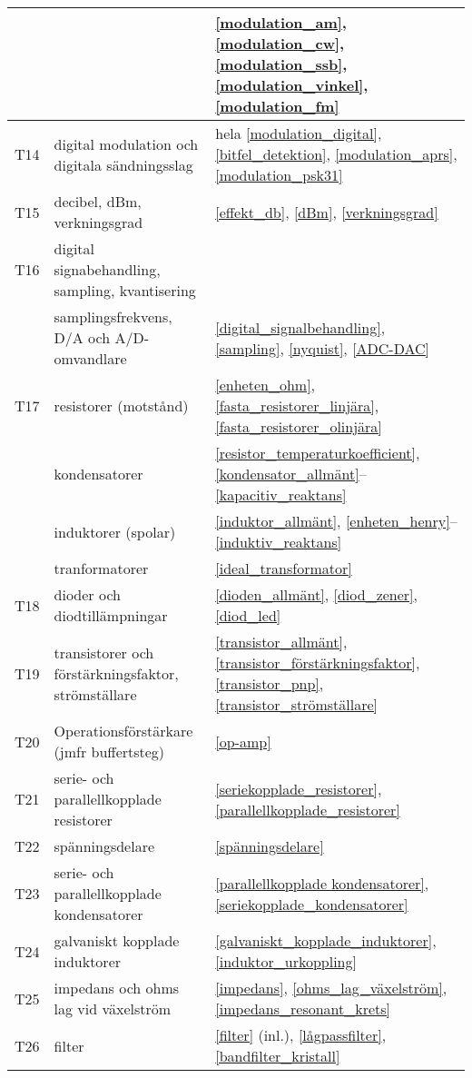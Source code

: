\begin{table}[H]
\begin{tabular}{rll}
 && \ref{modulation_am}, \ref{modulation_cw}, \ref{modulation_ssb}, 
 \ref{modulation_vinkel}, \ref{modulation_fm}\\ \hline
T14 & digital modulation och digitala sändningsslag &
hela \ref{modulation_digital}, \ref{bitfel_detektion}, \ref{modulation_aprs}, 
\ref{modulation_psk31}\\ \hline
T15 & decibel, dBm, verkningsgrad &
\ref{effekt_db}, \ref{dBm}, \ref{verkningsgrad}\\ \hline
T16 & digital signabehandling, sampling, kvantisering & \\
   & samplingsfrekvens, D/A och A/D-omvandlare &
\ref{digital_signalbehandling}, \ref{sampling}, \ref{nyquist}, \ref{ADC-DAC}\\ \hline
T17 & resistorer (motstånd) & 
\ref{enheten_ohm}, \ref{fasta_resistorer_linjära}, \ref{fasta_resistorer_olinjära}\\
& kondensatorer & 
\ref{resistor_temperaturkoefficient}, \ref{kondensator_allmänt}--\ref{kapacitiv_reaktans}\\ 
& induktorer (spolar) &
\ref{induktor_allmänt}, \ref{enheten_henry}--\ref{induktiv_reaktans} \\
& tranformatorer & 
\ref{ideal_transformator} \\ \hline
T18 & dioder och diodtillämpningar &
\ref{dioden_allmänt}, \ref{diod_zener}, \ref{diod_led}\\ \hline
T19 & transistorer och förstärkningsfaktor, strömställare &
\ref{transistor_allmänt}, \ref{transistor_förstärkningsfaktor}, \ref{transistor_pnp}, 
\ref{transistor_strömställare} \\ \hline
T20 & Operationsförstärkare (jmfr buffertsteg) & 
\ref{op-amp} \\ \hline
T21 & serie- och parallellkopplade resistorer &
\ref{seriekopplade_resistorer}, \ref{parallellkopplade_resistorer}\\ \hline
T22 & spänningsdelare & 
\ref{spänningsdelare}\\ \hline
T23 & serie- och parallellkopplade kondensatorer & 
\ref{parallellkopplade kondensatorer}, \ref{seriekopplade_kondensatorer} \\ \hline
T24 & galvaniskt kopplade induktorer & 
\ref{galvaniskt_kopplade_induktorer}, \ref{induktor_urkoppling}\\ \hline
T25 & impedans och ohms lag vid växelström & 
\ref{impedans}, \ref{ohms_lag_växelström}, \ref{impedans_resonant_krets}\\ \hline
T26 & filter & 
\ref{filter} (inl.), \ref{lågpassfilter}, \ref{bandfilter_kristall} \\ \hline

\end{tabular}
\end{table}
